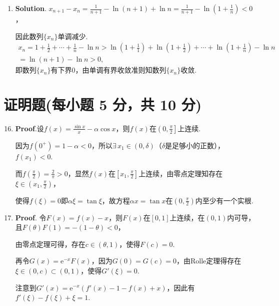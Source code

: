\documentclass[../main.tex]{subfiles}
\begin{document}
\begin{enumerate}
    \item \textbf{Solution}. $x_{n+1}-x_{n}=\frac{1}{n+1}-\ln(n+1)+\ln n=\frac{1}{n+1}
              -\ln\left(1+\frac{1}{n}\right)<0$，

          因此数列$\{x_{n}\}$单调减少.
          \[
              \begin{gathered}
                  x_n=1+\frac{1}{2}+\cdots+\frac{1}{n}-\ln n>\ln\left(1+\frac{1}{1}\right)+\ln\left(1+\frac{1}{2}\right)+\cdots+\ln\left(1+\frac{1}{n}\right)-\ln
                  n\\
                  =\ln(n+1)-\ln n>0,
              \end{gathered}
          \]
          即数列$\{x_{n}\}$有下界0，由单调有界收敛准则知数列$\{x_{n}\}$收敛.
\end{enumerate}

\section{证明题(每小题 5 分，共 10 分)}
\begin{enumerate}
    \setcounter{enumi}{15}
    \item \textbf{Proof}.设$f(x)=\frac{\sin x}{x}-\alpha\cos x$，则$f(x)$在$\left
              (0,\frac{\pi}{2}\right]$上连续.

          因为$f(0^{+})=1-\alpha<0$，所以$\exists\,x_{1}\in(0,\delta)$（$\delta$是足够小的正数），$f
              (x_{1})<0$.

          而$f\left(\frac{\pi}{2}\right)=\frac{2}{\pi}>0$，显然$f(x)$在$\left[x_{1},\frac{\pi}{2}
                  \right]$上连续，由零点定理知存在$\xi\in\left(x_{1},\frac{\pi}{2}\right)$，

          使得$f(\xi)=0$即$\alpha\xi=\tan\xi$，故方程$\alpha x=\tan x$在$\left(0,\frac{\pi}{2}
              \right)$内至少有一个实根.

    \item \textbf{Proof}. 令$F(x)=f(x)-x$，则$F(x)$在$[0,1]$上连续，在$(0,1)$内可导，且$F
              (\theta)F(1)=-(1-\theta)<0$，

          由零点定理可得，存在$c\in(\theta,1)$，使得$F(c)=0$.

          再令$G(x)=\mathrm{e}^{-x}F(x)$，因为$G(0)=G(c)=0$，由Rolle定理得存在$\xi\in
              (0,c)\subset(0,1)$，使得$G'(\xi)=0$.

          注意到$G'(x)=\mathrm{e}^{-x}(f'(x)-1-f(x)+x)$，因此有$f'(\xi)-f(\xi)+\xi=1$.
\end{enumerate}
\end{document}

